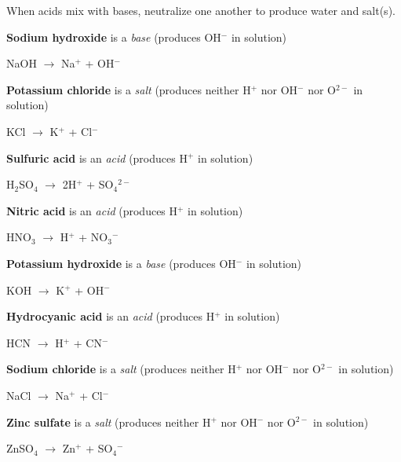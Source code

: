 





When acids mix with bases, neutralize one another to produce water and salt(s).

\vskip 10pt

{\bf Sodium hydroxide} is a {\it base} (produces OH$^{-}$ in solution)

NaOH $\to$ Na$^{+}$ + OH$^{-}$

\vskip 10pt

{\bf Potassium chloride} is a {\it salt} (produces neither H$^{+ }$ nor OH$^{-}$ nor O$^{2-}$ in solution)

KCl $\to$ K$^{+}$ + Cl$^{-}$

\vskip 10pt

{\bf Sulfuric acid} is an {\it acid} (produces H$^{+}$ in solution)

H$_{2}$SO$_{4}$ $\to$ 2H$^{+}$ + SO$_{4}$$^{2-}$

\vskip 10pt

{\bf Nitric acid} is an {\it acid} (produces H$^{+}$ in solution)

HNO$_{3}$ $\to$ H$^{+}$ + NO$_{3}$$^{-}$

\vskip 10pt

{\bf Potassium hydroxide} is a {\it base} (produces OH$^{-}$ in solution)

KOH $\to$ K$^{+}$ + OH$^{-}$

\vskip 10pt

{\bf Hydrocyanic acid} is an {\it acid} (produces H$^{+}$ in solution)

HCN $\to$ H$^{+}$ + CN$^{-}$

\vskip 10pt

{\bf Sodium chloride} is a {\it salt} (produces neither H$^{+ }$ nor OH$^{-}$ nor O$^{2-}$ in solution)

NaCl $\to$ Na$^{+}$ + Cl$^{-}$

\vskip 10pt

{\bf Zinc sulfate} is a {\it salt} (produces neither H$^{+ }$ nor OH$^{-}$ nor O$^{2-}$ in solution)

ZnSO$_{4}$ $\to$ Zn$^{+}$ + SO$_{4}$$^{-}$





